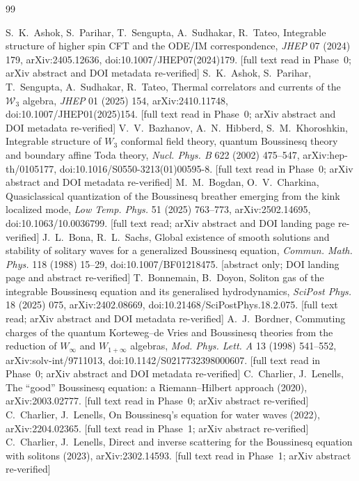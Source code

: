 \documentclass[11pt,a4paper]{article}
\theoremstyle{remark}
\begin{document}
\begin{thebibliography}{99}\small
\raggedright
{} S.~K.~Ashok, S.~Parihar, T.~Sengupta, A.~Sudhakar, R.~Tateo, Integrable structure of higher spin CFT and the ODE/IM correspondence, \emph{JHEP} 07 (2024) 179, arXiv:2405.12636, doi:10.1007/JHEP07(2024)179. [full text read in Phase~0; arXiv abstract and DOI metadata re-verified]
 S.~K.~Ashok, S.~Parihar, T.~Sengupta, A.~Sudhakar, R.~Tateo, Thermal correlators and currents of the $\mathcal W_3$ algebra, \emph{JHEP} 01 (2025) 154, arXiv:2410.11748, doi:10.1007/JHEP01(2025)154. [full text read in Phase~0; arXiv abstract and DOI metadata re-verified]
 V.~V.~Bazhanov, A.~N.~Hibberd, S.~M.~Khoroshkin, Integrable structure of $W_3$ conformal field theory, quantum Boussinesq theory and boundary affine Toda theory, \emph{Nucl. Phys. B} 622 (2002) 475--547, arXiv:hep-th/0105177, doi:10.1016/S0550-3213(01)00595-8. [full text read in Phase~0; arXiv abstract and DOI metadata re-verified]
 M.~M.~Bogdan, O.~V.~Charkina, Quasiclassical quantization of the Boussinesq breather emerging from the kink localized mode, \emph{Low Temp. Phys.} 51 (2025) 763--773, arXiv:2502.14695, doi:10.1063/10.0036799. [full text read; arXiv abstract and DOI landing page re-verified]
 J.~L.~Bona, R.~L.~Sachs, Global existence of smooth solutions and stability of solitary waves for a generalized Boussinesq equation, \emph{Commun. Math. Phys.} 118 (1988) 15--29, doi:10.1007/BF01218475. [abstract only; DOI landing page and abstract re-verified]
 T.~Bonnemain, B.~Doyon, Soliton gas of the integrable Boussinesq equation and its generalised hydrodynamics, \emph{SciPost Phys.} 18 (2025) 075, arXiv:2402.08669, doi:10.21468/SciPostPhys.18.2.075. [full text read; arXiv abstract and DOI metadata re-verified]
 A.~J.~Bordner, Commuting charges of the quantum Korteweg--de Vries and Boussinesq theories from the reduction of $W_\infty$ and $W_{1+\infty}$ algebras, \emph{Mod. Phys. Lett. A} 13 (1998) 541--552, arXiv:solv-int/9711013, doi:10.1142/S0217732398000607. [full text read in Phase~0; arXiv abstract and DOI metadata re-verified]
 C.~Charlier, J.~Lenells, The ``good'' Boussinesq equation: a Riemann--Hilbert approach (2020), arXiv:2003.02777. [full text read in Phase~0; arXiv abstract re-verified]
 C.~Charlier, J.~Lenells, On Boussinesq's equation for water waves (2022), arXiv:2204.02365. [full text read in Phase~1; arXiv abstract re-verified]
 C.~Charlier, J.~Lenells, Direct and inverse scattering for the Boussinesq equation with solitons (2023), arXiv:2302.14593. [full text read in Phase~1; arXiv abstract re-verified]

\end{thebibliography}
\end{document}
